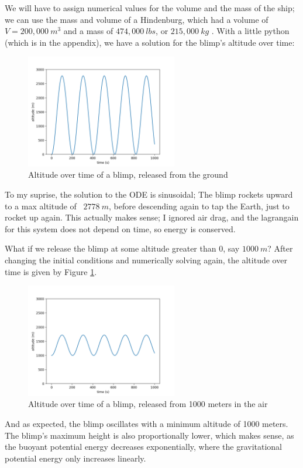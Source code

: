 \documentclass[titlepage]{article}
\begin{document}
We will have to assign numerical values for the volume and the mass of the ship; we can use the mass and volume of a Hindenburg, which had a volume of $V = 200,000~m^3$ and a mass of $474,000~lbs$, or $215,000~kg$ \cite{zeppelin}. With a little python (which is in the appendix), we have a solution for the blimp's altitude over time:
\begin{figure}[h]
    \centering
    \includegraphics[width=250px]{p1_0m_release.png}
    \caption{Altitude over time of a blimp, released from the ground}
\end{figure}
To my suprise, the solution to the ODE is sinusoidal; The blimp rockets upward to a max altitude of ~$2778~m$, before descending again to tap the Earth, just to rocket up again. This actually makes sense; I ignored air drag, and the lagrangain for this system does not depend on time, so energy is conserved.

\newpage
What if we release the blimp at some altitude greater than 0, say $1000~m$? After changing the initial conditions and numerically solving again, the altitude over time is given by Figure \ref{fig:1000mrelease}.
\begin{figure}[h!]
    \centering
    \includegraphics[width=250px]{p1_1000m_release.png}
    \caption{Altitude over time of a blimp, released from 1000 meters in the air}
    \label{fig:1000mrelease}
\end{figure}
And as expected, the blimp oscillates with a minimum altitude of 1000 meters. The blimp's maximum height is also proportionally lower, which makes sense, as the buoyant potential energy decreases exponentially, where the gravitational potential energy only increases linearly.
\vspace{8pt}
\end{document}
